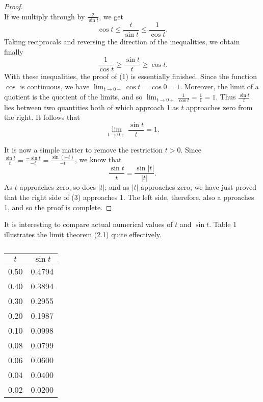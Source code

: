 \begin{proof}
$$$$
If we multiply through by $\frac{2}{\sin t}$, we get  
$$
\cos t \leq \frac{t}{\sin t} \leq \frac{ 1}{\cos t}.
$$
Taking reciprocals and reversing the direction of the inequalities, we obtain finally
\begin{equation}
\frac{1}{\cos t} \geq \frac{\sin t}{t} \geq \cos t.  
\label{eq6.2.2}
\end{equation}
With these inequalities, the proof of (1) is essentially finished. Since the function $\cos$ is continuous, we have $\lim_{t \rightarrow 0+} \cos t = \cos 0 = 1$. Moreover, the limit of a quotient is the quotient of the limits, and so $\lim_{t \rightarrow 0+} \frac{1}{\cos t} = \frac{1}{1} = 1$.
 Thus $\frac{\sin t}{t}$ lies between two quantities both of which approach 1 as $t$ approaches zero from the right. It follows that 
$$
\lim_{t \rightarrow 0+} \frac{\sin t}{t} = 1.  
$$

It is now a simple matter to remove the restriction $t > 0$. Since $\frac{\sin t}{t} = \frac{- \sin t}{-t} = \frac{\sin(-t)}{-t}$,  we know that
\begin{equation}
\frac{\sin t}{t} = \frac{\sin |t|}{|t|}.
\label{eq6.2.3}
\end{equation}
As $t$ approaches zero, so does $|t|$; and as $|t|$ approaches zero, we have just proved that the right side of (3) approaches 1. The left side, therefore, also a pproaches 1, and so the proof is complete.
\end{proof}

It is interesting to compare actual numerical values of $t$ and $\sin t$.
Table 1 illustrates the limit theorem (2.1) quite effectively.
\medskip

\begin{table}
\centering
\begin{tabular}{c|c}\hline
\centering
  $t$ & $\sin t$ \\ \hline
0.50 & 0.4794 \\
0.40 & 0.3894 \\
0.30 & 0.2955 \\
0.20 & 0.1987 \\
0.10 & 0.0998 \\
0.08 & 0.0799 \\
0.06 & 0.0600 \\
0.04 & 0.0400 \\
0.02 & 0.0200 \\ \hline
\end{tabular}
\caption{}
\label{table 6.1}
\end{table}
\medskip

